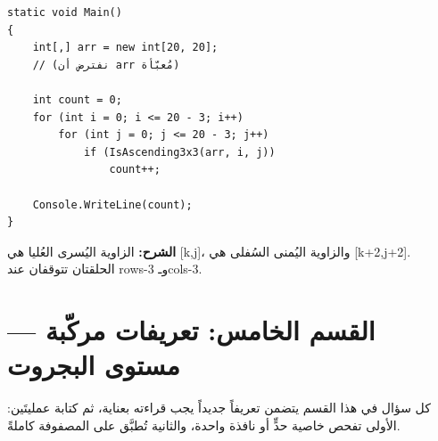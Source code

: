 \documentclass[14pt]{extarticle}
\begin{document}
\begin{enumerate}[itemsep=2em]
\begin{boxSolution}
\begin{boxCode}
\begin{english}
\begin{verbatim}
static void Main()
{
    int[,] arr = new int[20, 20];
    // (نفترض أن arr مُعبّأة)

    int count = 0;
    for (int i = 0; i <= 20 - 3; i++)
        for (int j = 0; j <= 20 - 3; j++)
            if (IsAscending3x3(arr, i, j))
                count++;

    Console.WriteLine(count);
}
\end{verbatim}
\end{english}
\end{boxCode}
\textbf{الشرح:} الزاوية اليُسرى العُليا هي \textenglish{[k,j]}، والزاوية اليُمنى السُفلى هي \textenglish{[k+2,j+2]}. الحلقتان تتوقفان عند \textenglish{rows-3} وـ\textenglish{cols-3}.
\end{boxSolution}
\fi

\end{enumerate}

\clearpage
\section*{القسم الخامس: تعريفات مركّبة — مستوى البجروت}

\begin{boxAttention}
كل سؤال في هذا القسم يتضمن تعريفاً جديداً يجب قراءته بعناية، ثم كتابة عمليتَين: الأولى تفحص خاصية حدٍّ أو نافذة واحدة، والثانية تُطبَّق على المصفوفة كاملةً.
\end{boxAttention}
\end{document}
